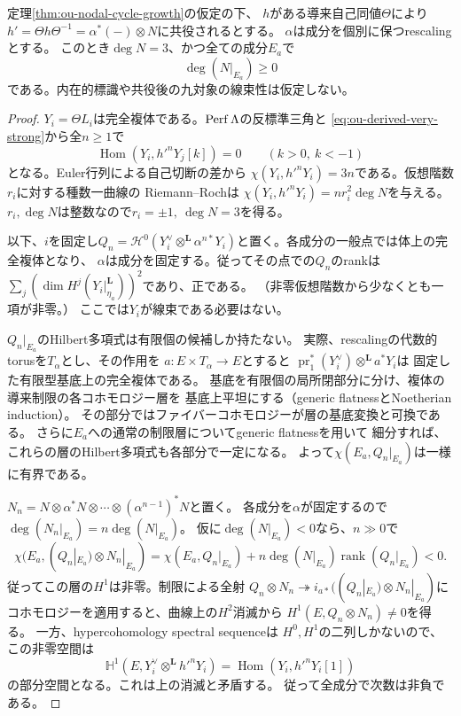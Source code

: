 \begin{proposition}[幾何的共役における負の多重次数の排除]
\label{prop:ou-nodal-conjugate-nef}
定理\ref{thm:ou-nodal-cycle-growth}の仮定の下、
$h$がある導来自己同値$\Theta$により
$h'=\Theta h\Theta^{-1}=\alpha^*(-)\otimes N$に共役されるとする。
$\alpha$は成分を個別に保つrescalingとする。
このとき$\deg N=3$、かつ全ての成分$E_a$で
\[
 \deg(N|_{E_a})\geq0
\]
である。内在的標識や共役後の九対象の線束性は仮定しない。
\end{proposition}
\begin{proof}
$Y_i=\Theta L_i$は完全複体である。$\operatorname{Perf}\Lambda$の反標準三角と
\eqref{eq:ou-derived-very-strong}から全$n\geq1$で
\[
 \operatorname{Hom}(Y_i,h'^nY_j[k])=0\qquad(k>0,\ k<-1)
\]
となる。Euler行列による自己切断の差から
$\chi(Y_i,h'^nY_i)=3n$である。仮想階数$r_i$に対する種数一曲線の
Riemann--Rochは
$\chi(Y_i,h'^nY_i)=nr_i^2\deg N$を与える。
$r_i,\deg N$は整数なので$r_i=\pm1,\ \deg N=3$を得る。

以下、$i$を固定し$Q_n=\mathcal H^0(Y_i^\vee\otimes^{\mathbf L}
\alpha^{n*}Y_i)$と置く。各成分の一般点では体上の完全複体となり、
$\alpha$は成分を固定する。従ってその点での$Q_n$のrankは
$\sum_j(\dim H^j(Y_i|_{\eta_a}^{\mathbf L}))^2$であり、正である。
（非零仮想階数から少なくとも一項が非零。）
ここでは$Y_i$が線束である必要はない。

$Q_n|_{E_a}$のHilbert多項式は有限個の候補しか持たない。
実際、rescalingの代数的torusを$T_\alpha$とし、その作用を
$a:E\times T_\alpha\to E$とすると
$\operatorname{pr}_1^*(Y_i^\vee)\otimes^{\mathbf L}a^*Y_i$は
固定した有限型基底上の完全複体である。
基底を有限個の局所閉部分に分け、複体の導来制限の各コホモロジー層を
基底上平坦にする（generic flatnessとNoetherian induction）。
その部分ではファイバーコホモロジーが層の基底変換と可換である。
さらに$E_a$への通常の制限層についてgeneric flatnessを用いて
細分すれば、これらの層のHilbert多項式も各部分で一定になる。
よって$\chi(E_a,Q_n|_{E_a})$は一様に有界である。

$N_n=N\otimes\alpha^*N\otimes\cdots\otimes(\alpha^{n-1})^*N$と置く。
各成分を$\alpha$が固定するので
$\deg(N_n|_{E_a})=n\deg(N|_{E_a})$。
仮に$\deg(N|_{E_a})<0$なら、$n\gg0$で
\[
 \chi(E_a,(Q_n|_{E_a})\otimes N_n|_{E_a})
 =\chi(E_a,Q_n|_{E_a})+
 n\deg(N|_{E_a})\operatorname{rank}(Q_n|_{E_a})<0 .
\]
従ってこの層の$H^1$は非零。制限による全射
$Q_n\otimes N_n\twoheadrightarrow
 i_{a*}((Q_n|_{E_a})\otimes N_n|_{E_a})$に
コホモロジーを適用すると、曲線上の$H^2$消滅から
$H^1(E,Q_n\otimes N_n)\ne0$を得る。
一方、hypercohomology spectral sequenceは
$H^0,H^1$の二列しかないので、この非零空間は
\[
 \mathbb H^1(E,Y_i^\vee\otimes^{\mathbf L}h'^nY_i)
 =\operatorname{Hom}(Y_i,h'^nY_i[1])
\]
の部分空間となる。これは上の消滅と矛盾する。
従って全成分で次数は非負である。
\end{proof}

